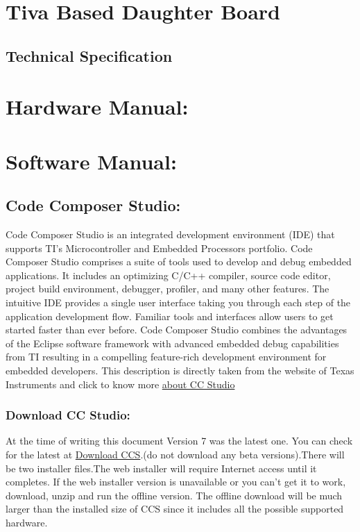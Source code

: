 \documentclass[17pt]{article}
\begin{document}
{	\section{\Huge\textbf{Tiva Based Daughter Board}}
		\subsection{{\huge \textbf{Technical Specification}}}
		\subsection{}%
	\section{\Huge\textbf{Hardware Manual:}}
	\section{\Huge\textbf{Software Manual:}}
		\subsection{\huge \textbf{Code Composer Studio:}}
			{\large Code Composer Studio is an integrated development environment (IDE) that supports TI's Microcontroller and Embedded Processors portfolio. Code Composer Studio comprises a suite of tools used to develop and debug embedded applications. It includes an optimizing C/C++ compiler, source code editor, project build environment, debugger, profiler, and many other features. The intuitive IDE provides a single user interface taking you through each step of the application development flow. Familiar tools and interfaces allow users to get started faster than ever before. Code Composer Studio combines the advantages of the Eclipse software framework with advanced embedded debug capabilities from TI resulting in a compelling feature-rich development environment for embedded developers. This description is directly taken from the website of Texas Instruments and click to know more	\href{http://www.ti.com/tool/ccstudio}{about CC Studio}\\}}%
			\subsubsection{\Large\textbf{Download CC Studio:}}
			{\large At the time of writing this document Version 7 was the latest one. You can check for the latest at \href{http://processors.wiki.ti.com/index.php/Download_CCS}{Download CCS}.(do not download
				any beta versions).There will be two installer files.The web installer will require Internet access until it	completes. If the web installer version is unavailable or you can’t get it to work,
				download, unzip and run the offline version. The offline download will be much larger
				than the installed size of CCS since it includes all the possible supported hardware.}
\end{document}
